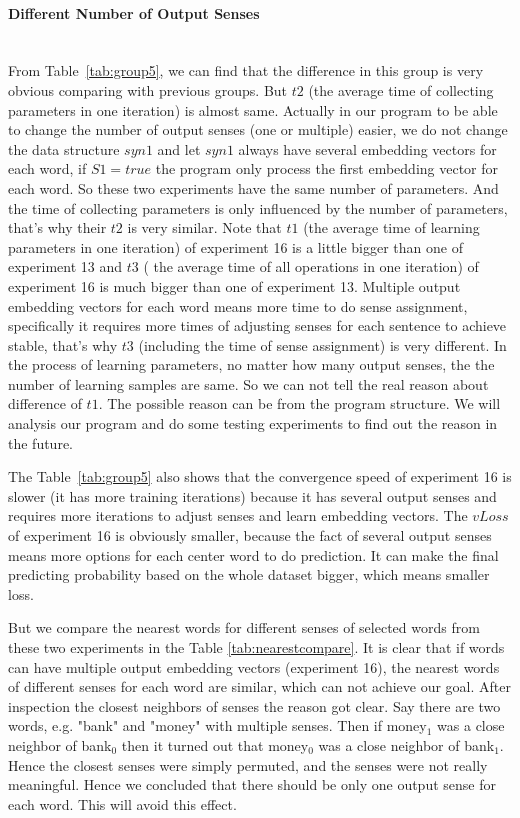 \paragraph{Different Number of Output Senses}  \ \\
From Table~\ref{tab:group5}, we can find that the difference in this group is very obvious comparing with previous groups. But $t2$ (the average time of collecting parameters in one iteration) is almost same. Actually in our program to be able to change the  number of output senses (one or multiple) easier, we do not change the data structure $syn1$ and let $syn1$ always have several embedding vectors for each word, if $S1=true$ the program only process the first embedding vector for each word. So these two experiments have the same number of parameters. And the time of collecting parameters is only influenced by the number of parameters, that's why their $t2$ is very similar. Note that $t1$ (the average time of learning parameters in one iteration) of experiment 16 is a little bigger than one of experiment 13  and $t3$ ( the average time of all operations in one iteration) of experiment 16 is much bigger than one of experiment 13. Multiple output embedding vectors for each word means more time to do sense assignment, specifically it requires more times of adjusting senses for each sentence to achieve stable, that's why $t3$ (including the time of sense assignment) is very different. In the process of learning parameters, no matter how many output senses, the the number of learning samples are same. So we can not tell the real reason about difference of $t1$. The possible reason can be from the program structure. We will analysis our program and do some testing experiments to find out the reason in the future.

The Table~\ref{tab:group5} also shows that the convergence speed of experiment 16 is slower (it has more training iterations) because it has several output senses and requires more iterations to adjust senses and learn embedding vectors. The $vLoss$ of experiment 16 is obviously smaller, because the fact of several output senses means more options for each center word to do prediction. It can make the final predicting probability based on the whole dataset bigger, which means smaller loss. 

But we compare the nearest words for different senses of selected words from these two experiments in the Table \ref{tab:nearestcompare}. It is clear that if words can have multiple output embedding vectors (experiment 16), the nearest words of different senses for each word are similar, which can not achieve our goal. After inspection the closest neighbors of senses the reason got clear. Say there are two words, e.g. "bank" and "money" with multiple senses. Then if money$_1$ was a close neighbor of bank$_0$ then it turned out that money$_0$ was a close neighbor of bank$_1$. Hence the closest senses were simply permuted, and the senses were not really meaningful. Hence we concluded that there should be only one output sense for each word. This will avoid this effect. 

